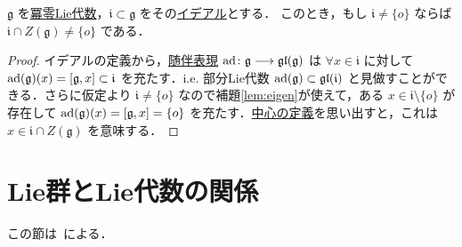 \documentclass[rep_main]{subfiles}
\begin{document}
\begin{mylem}[label=lem:nilpo-ideal]{}
    $\mathfrak{g}$ を\hyperref[def:nilpotent-LieAlg]{冪零Lie代数}，$\mathfrak{i} \subset \mathfrak{g}$ をその\hyperref[def:ideal-LieAlg]{イデアル}とする．
    このとき，もし $\mathfrak{i} \neq \{o\}$ ならば $\mathfrak{i} \cap Z(\mathfrak{g}) \neq \{o\}$ である．
\end{mylem}

\begin{proof}
    イデアルの定義から，\hyperref[def:adj-LieAlg]{随伴表現} $\operatorname{ad} \colon \mathfrak{g} \longrightarrow \mathfrak{gl} (\mathfrak{g})$ は $\forall x \in \mathfrak{i}$ に対して $\ad (\mathfrak{g})(x) = \comm{\mathfrak{g}}{x} \subset \mathfrak{i}$ を充たす．i.e. 部分Lie代数 $\operatorname{ad}(\mathfrak{g}) \subset \mathfrak{gl} (\mathfrak{i})$ と見做すことができる．さらに仮定より $\mathfrak{i} \neq \{o\}$ なので補題\ref{lem:eigen}が使えて，ある $x \in \mathfrak{i} \setminus \{o\}$ が存在して $\ad (\mathfrak{g}) (x) = \comm{\mathfrak{g}}{x} = \{o\}$ を充たす．\hyperref[def:center-LieAlg]{中心の定義}を思い出すと，これは $x \in \mathfrak{i} \cap Z(\mathfrak{g})$ を意味する．
\end{proof}

\section{Lie群とLie代数の関係}

この節は~\cite[第5章]{Kobayashi2005Lie}による．
\end{document}
